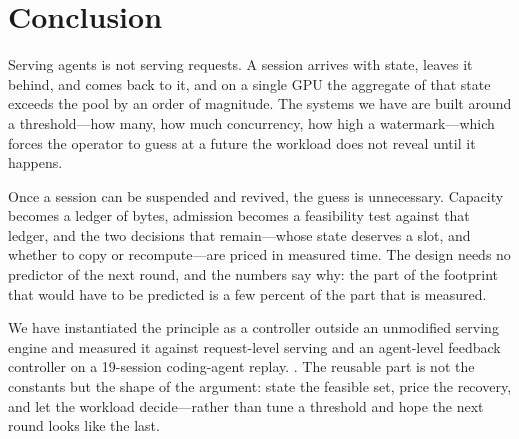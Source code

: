\section{Conclusion}
\label{sec:conclusion}

Serving agents is not serving requests. A session arrives with state, leaves it behind, and
comes back to it, and on a single GPU the aggregate of that state exceeds the pool by an
order of magnitude. The systems we have are built around a threshold---how many, how much
concurrency, how high a watermark---which forces the operator to guess at a future the
workload does not reveal until it happens.

Once a session can be suspended and revived, the guess is unnecessary. Capacity becomes a
ledger of bytes, admission becomes a feasibility test against that ledger, and the two
decisions that remain---whose state deserves a slot, and whether to copy or recompute---are
priced in measured time. The design needs no predictor of the next round, and the numbers
say why: the part of the footprint that would have to be predicted is a few percent of the
part that is measured.

We have instantiated the principle as a controller outside an unmodified serving engine and
measured it against request-level serving and an agent-level feedback controller on a
19-session coding-agent replay. . The
reusable part is not the constants but the shape of the argument: state the feasible set,
price the recovery, and let the workload decide---rather than tune a threshold and hope the
next round looks like the last.
